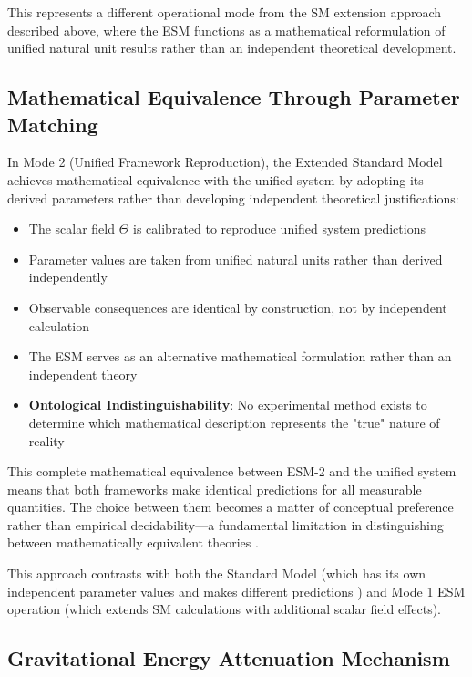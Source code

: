 	This represents a different operational mode from the SM extension approach described above, where the ESM functions as a mathematical reformulation of unified natural unit results rather than an independent theoretical development.
	
	\subsection{Mathematical Equivalence Through Parameter Matching}
	\label{subsec:mathematical_equivalence_parameters}
	
	In Mode 2 (Unified Framework Reproduction), the Extended Standard Model achieves mathematical equivalence with the unified system by adopting its derived parameters rather than developing independent theoretical justifications:
	
	\begin{itemize}
		\item The scalar field $\Theta$ is calibrated to reproduce unified system predictions
		\item Parameter values are taken from unified natural units rather than derived independently
		\item Observable consequences are identical by construction, not by independent calculation
		\item The ESM serves as an alternative mathematical formulation rather than an independent theory
		\item \textbf{Ontological Indistinguishability}: No experimental method exists to determine which mathematical description represents the "true" nature of reality \cite{Duhem1906,Poincare1905}
	\end{itemize}
	
	This complete mathematical equivalence between ESM-2 and the unified system means that both frameworks make identical predictions for all measurable quantities. The choice between them becomes a matter of conceptual preference rather than empirical decidability—a fundamental limitation in distinguishing between mathematically equivalent theories \cite{vanFraassen1980}.
	
	This approach contrasts with both the Standard Model (which has its own independent parameter values and makes different predictions \cite{Weinberg1989}) and Mode 1 ESM operation (which extends SM calculations with additional scalar field effects).
	
	\subsection{Gravitational Energy Attenuation Mechanism}
	\label{subsec:gravitational_energy_attenuation}
	
